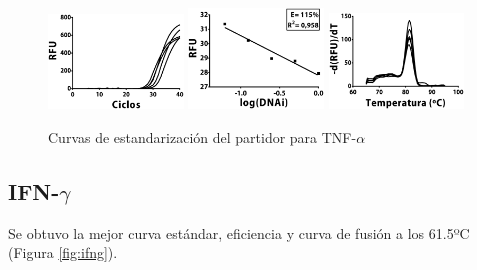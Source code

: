 \documentclass[12pt,letterpaper,oneside]{scrbook}
\begin{document}
\begin{figure}[h!]
\centering
        {\includegraphics[width=0.32\textwidth]{standarization/tnfa/ampl}}
        {\includegraphics[width=0.32\textwidth]{standarization/tnfa/stand}}
        {\includegraphics[width=0.32\textwidth]{standarization/tnfa/melting}}
        \caption{Curvas de estandarización del partidor para TNF-$\alpha$}
    \label {fig:tnfa}
\end{figure}

\subsection{IFN-$\gamma$}

Se obtuvo la mejor curva estándar, eficiencia y curva de fusión a los
61.5ºC (Figura \ref{fig:ifng}).
\end{document}
